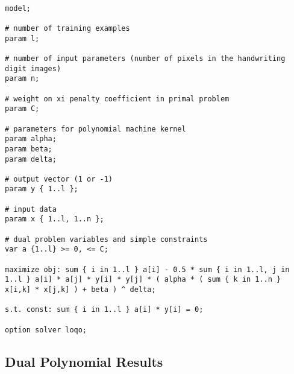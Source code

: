 \documentclass{article}
\begin{document}
\begin{verbatim}

model;

# number of training examples
param l;

# number of input parameters (number of pixels in the handwriting digit images)
param n;

# weight on xi penalty coefficient in primal problem
param C;

# parameters for polynomial machine kernel
param alpha;
param beta;
param delta;

# output vector (1 or -1)
param y { 1..l };

# input data
param x { 1..l, 1..n };

# dual problem variables and simple constraints
var a {1..l} >= 0, <= C;

maximize obj: sum { i in 1..l } a[i] - 0.5 * sum { i in 1..l, j in 1..l } a[i] * a[j] * y[i] * y[j] * ( alpha * ( sum { k in 1..n } x[i,k] * x[j,k] ) + beta ) ^ delta;

s.t. const: sum { i in 1..l } a[i] * y[i] = 0;

option solver loqo;

\end{verbatim}

\subsection{Dual Polynomial Results}
\end{document}
